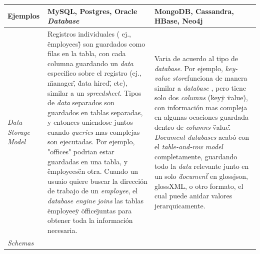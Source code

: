\begin{table}[h!]
\begin{tabular}{ |L{0.1\paperwidth}|L{0.3\paperwidth}|L{0.3\paperwidth}|}
\\ \hline
	Ejemplos&%
	MySQL, Postgres, Oracle \textit{Database}&
	MongoDB, Cassandra, HBase, Neo4j
\\ \hline
	\textit{Data Storage Model}&
	Registros individuales ( ej., \"employees\") son guardados como filas en la tabla, con cada columna guardando un \textit{data} especifico sobre el registro (ej., \"manager\", \"data hired\", etc), similar a un \textit{spreedsheet}. Tipos de \textit{data} separados son guardados en tablas separadas, y entonces uniendose juntos cuando \textit{queries} mas complejas son ejecutadas. Por ejemplo, "offices" podrian estar guardadas en una tabla, y \"employees\" en otra. Cuando un usuaio quiere buscar la dirección de trabajo de un \textit{employee}, el \textit{database engine} \textit{joins} las tablas \"employee\" y \"office\" juntas para obtener toda la información necesaria.&
	
	Varia de acuerdo al tipo de \textit{database}. Por ejemplo, \textit{key-value store}funciona de manera similar a \textit{database} , pero tiene solo dos \textit{columns} (\"key\" y \"value\"), con información mas compleja en algunas ocaciones guardada dentro de \textit{columns} \"value\". \textit{Document databases} acabó con el \textit{table-and-row model} completamente, guardando todo la \textit{data} relevante junto en un solo \textit{\"document\"} en gloss{json}, gloss{XML}, o otro formato, el cual puede anidar valores jerarquicamente.
	

\\ \hline
	\textit{Schemas}&
	

\end{tabular}
\end{table}
